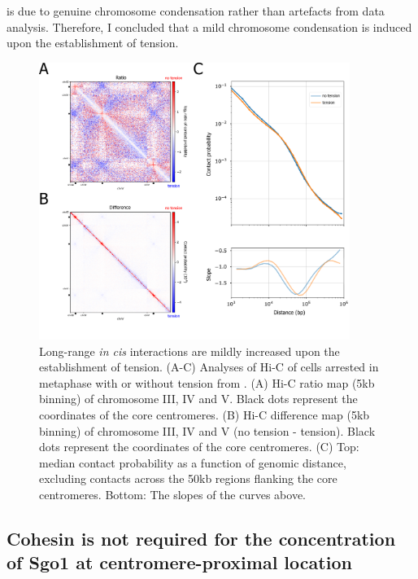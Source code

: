 is due to genuine chromosome condensation rather than artefacts from data analysis. Therefore, I concluded that a mild chromosome condensation is induced upon the establishment of tension. 

\begin{figure}[htbp]
  \centering
  \includegraphics[width=0.9\textwidth]{chapter3/figures/+-tension Hi-C.pdf}
  \caption[Long-range \textit{in cis} interactions are mildly increased upon the establishment of tension]{Long-range \textit{in cis} interactions are mildly increased upon the establishment of tension. (A-C) Analyses of Hi-C of cells arrested in metaphase with or without tension from \cite{Paldi2020ConvergentPericentromeres}. (A) Hi-C ratio map (5kb binning) of chromosome III, IV and V. Black dots represent the coordinates of the core centromeres. (B) Hi-C difference map (5kb binning) of chromosome III, IV and V (no tension - tension). Black dots represent the coordinates of the core centromeres. (C) Top: median contact probability as a function of genomic distance, excluding contacts across the 50kb regions flanking the core centromeres. Bottom: The slopes of the curves above.}
  \label{fig:Hi-C+-tension}
\end{figure}

\subsection{Cohesin is not required for the concentration of Sgo1 at centromere-proximal location}

